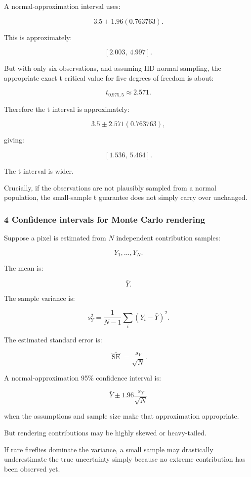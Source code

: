 A normal-approximation interval uses:

\[
 3.5\pm1.96(0.763763).
\]

This is approximately:

\[
 \boxed{[2.003,\ 4.997]}.
\]

But with only six observations, and assuming IID normal sampling, the appropriate exact t critical value for five degrees of freedom is about:

\[
 t_{0.975,5}\approx2.571.
\]

Therefore the t interval is approximately:

\[
 3.5\pm2.571(0.763763),
\]

giving:

\[
 \boxed{[1.536,\ 5.464]}.
\]

The t interval is wider.

Crucially, if the observations are not plausibly sampled from a normal population, the small-sample t guarantee does not simply carry over unchanged.

\subsubsection{4 Confidence intervals for Monte Carlo rendering}\label{02-foundations-ii-ch030-confidence-intervals-for-monte-carlo-rendering}

Suppose a pixel is estimated from \(N\) independent contribution samples:

\[
 Y_1,\ldots,Y_N.
\]

The mean is:

\[
 \bar Y.
\]

The sample variance is:

\[
 s_Y^2= \frac1{N-1}\sum_i(Y_i-\bar Y)^2.
\]

The estimated standard error is:

\[
 \boxed{ \widehat{\operatorname{SE}}= \frac{s_Y}{\sqrt N} }.
\]

A normal-approximation 95\% confidence interval is:

\[
 \boxed{ \bar Y\pm1.96\frac{s_Y}{\sqrt N} }
\]

when the assumptions and sample size make that approximation appropriate.

But rendering contributions may be highly skewed or heavy-tailed.

If rare fireflies dominate the variance, a small sample may drastically underestimate the true uncertainty simply because no extreme contribution has been observed yet.

